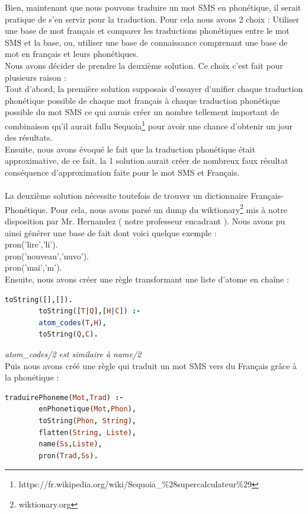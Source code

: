 \documentclass[11pt]{report}
\begin{document}
	Bien, maintenant que nous pouvons traduire un mot SMS en phonétique, il serait pratique de s'en servir pour la traduction. Pour cela nous avons 2 choix : Utiliser une base de mot français et comparer les traductions phonétiques entre le mot SMS et la base, ou, utiliser une base de connaissance comprenant une base de mot en français et leurs phonétiques.\\
	Nous avons décider de prendre la deuxième solution. Ce choix c'est fait pour plusieurs raison :\\
	Tout d'abord, la première solution supposais d'essayer d'unifier chaque traduction phonétique possible de chaque mot français à chaque traduction phonétique possible du mot SMS ce qui aurais créer un nombre tellement important de combinaison qu'il aurait fallu Sequoia\footnote{https://fr.wikipedia.org/wiki/Sequoia\_\%28supercalculateur\%29} pour avoir une chance d'obtenir un jour des résultats.\\
	Ensuite, nous avons évoqué le fait que la traduction phonétique était approximative, de ce fait, la 1 solution aurait créer de nombreux faux résultat conséquence d'approximation faite pour le mot SMS et Français.
	\paragraph{}
	La deuxième solution nécessite toutefois de trouver un dictionnaire Français-Phonétique. Pour cela, nous avons parsé un dump du wiktionary\footnote{wiktionary.org} mis à notre disposition par Mr. Hernandez ( notre professeur encadrant ).
	Nous avons pu ainsi générer une base de fait dont voici quelque exemple :\\
	
	\indent pron('lire','li').\\
	\indent pron('nouveau','nuvo').\\
	\indent pron('mai','m').\\
	
	Ensuite, nous avons créer une règle transformant une liste d'atome en chaîne :
	\begin{lstlisting}[language=Prolog]
	toString([],[]).
		toString([T|Q],[H|C]) :-
		atom_codes(T,H),
		toString(Q,C).
	\end{lstlisting}
	
	{\em atom\_codes/2 est similaire à name/2}\\
	
	Puis nous avons créé une règle qui traduit un mot SMS vers du Français grâce à la phonétique :
	\begin{lstlisting}[language=Prolog]
	traduirePhoneme(Mot,Trad) :-
		enPhonetique(Mot,Phon),
		toString(Phon, String),
		flatten(String, Liste),
		name(Ss,Liste),
		pron(Trad,Ss).
	\end{lstlisting}
	
\end{document}
